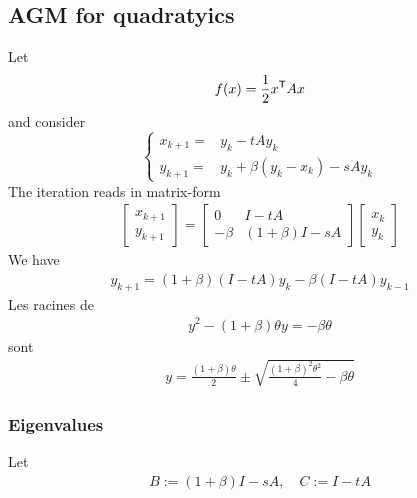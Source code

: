 \documentclass[english,12pt,a4paper]{article}
\begin{document}
\subsection{AGM for quadratyics}\label{subsec:}
%
Let 
%
\begin{equation}\label{eq:}
f(x) = \frac12 x^{\mathsf{T}} A x  
\end{equation}
%
and consider
%
%
\begin{equation}\label{eq:}
%
\left\{
\begin{aligned}
x_{k+1} =& y_k - t A y_k\\
y_{k+1} =& y_k  + \beta(y_k-x_k) - s A y_k
\end{aligned}
\right.
%
\end{equation}
%
The iteration reads in matrix-form
%
\begin{align*}
\begin{bmatrix}
x_{k+1} \\ y_{k+1}
\end{bmatrix}
=
\begin{bmatrix}
0 & I-tA\\
-\beta & (1+\beta)I - sA
\end{bmatrix}
\begin{bmatrix}
x_{k} \\ y_{k}
\end{bmatrix}
\end{align*}
%
We have
%
\begin{align*}
y_{k+1} = (1+\beta) (I-tA) y_k - \beta (I-tA)y_{k-1}
\end{align*}
%
Les racines de
%
\begin{align*}
y^2 - (1+\beta)\theta y = -\beta\theta
\end{align*}
%
sont
%
\begin{align*}
y = \frac{(1+\beta)\theta}{2} \pm \sqrt{\frac{(1+\beta)^2\theta^2}{4} - \beta\theta}
\end{align*}
%



%
\subsubsection{Eigenvalues}
%
Let
%
\begin{align*}
B := (1+\beta)I - sA, \quad C := I-tA
\end{align*}
%
\end{document}
